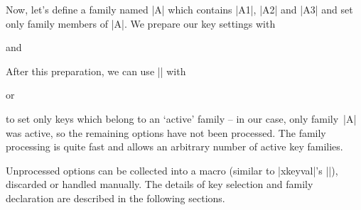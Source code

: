 Now, let's define a family named |A| which contains |A1|, |A2| and |A3| and set only family members of |A|. We prepare our key settings with
\begin{codeexample}
\end{codeexample}
\noindent and
\begin{codeexample}
\end{codeexample}
\noindent After this preparation, we can use |\pgfkeysfiltered| with
\begin{codeexample}[]
\end{codeexample}
\noindent or
\begin{codeexample}[]
\end{codeexample}
\noindent to set only keys which belong to an `active' family -- in our case, only family~|A| was active, so the remaining options have not been processed. The family processing is quite fast and allows an arbitrary number of active key families.

Unprocessed options can be collected into a macro (similar to |xkeyval|'s |\xkv@rm|), discarded or handled manually. The details of key selection and family declaration are described in the following sections.

